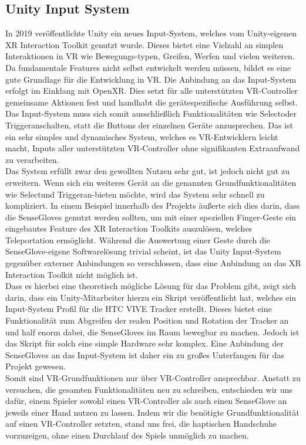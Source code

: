 \subsection{Unity Input System}
In 2019 veröffentlichte Unity ein neues Input-System, welches vom Unity-eigenen XR Interaction Toolkit genutzt wurde. Dieses bietet eine Vielzahl an simplen Interaktionen in VR wie Bewegungs-typen, Greifen, Werfen und vielen weiteren. Da fundamentale Features nicht selbst entwickelt werden müssen, bildet es eine gute Grundlage für die Entwicklung in VR. Die Anbindung an das Input-System erfolgt im Einklang mit OpenXR. Dies setzt für alle unterstützten VR-Controller gemeinsame Aktionen fest und handhabt die gerätespezifische Ausführung selbst. Das Input-System muss sich somit ausschließlich Funktionalitäten wie \dq Select\dq oder \dq Trigger\dq anschalten, statt die Buttons der einzelnen Geräte anzusprechen. Das ist ein sehr simples und dynamisches System, welches es VR-Entwicklern leicht macht, Inputs aller unterstützten VR-Controller ohne signifikanten Extraaufwand zu verarbeiten.\\
\noindent Das System erfüllt zwar den gewollten Nutzen sehr gut, ist jedoch nicht gut zu erweitern. Wenn sich ein weiteres Gerät an die genannten Grundfunktionalitäten wie \dq Select\dq und \dq Trigger\dq an-bieten möchte, wird das System sehr schnell zu kompliziert. In einem Beispiel innerhalb des Projekts äußerte sich dies darin, dass die SenseGloves genutzt werden sollten, um mit einer speziellen Finger-Geste ein eingebautes Feature des XR Interaction Toolkits auszulösen, welches Teleportation ermöglicht. Während die Auswertung einer Geste durch die SenseGlove-eigene Softwarelösung trivial scheint, ist das Unity Input-System gegenüber externer Anbindungen so verschlossen, dass eine Anbindung an das XR Interaction Toolkit nicht möglich ist.\\
\noindent Dass es hierbei eine theoretisch mögliche Lösung für das Problem gibt, zeigt sich darin, dass ein Unity-Mitarbeiter hierzu ein Skript veröffentlicht hat, welches ein Input-System Profil für die HTC VIVE Tracker erstellt. Dieses bietet eine Funktionalität zum Abgreifen der realen Position und Rotation der Tracker an und half enorm dabei, die SenseGloves im Raum bewegbar zu machen. Jedoch ist das Skript für solch eine simple Hardware sehr komplex. Eine Anbindung der SenseGloves an das Input-System ist daher ein zu großes Unterfangen für das Projekt gewesen.\\
\noindent Somit sind VR-Grundfunktionen nur über VR-Controller ansprechbar. Anstatt zu versuchen, die gesamten Funktionalitäten neu zu schreiben, entschieden wir uns dafür, einem Spieler sowohl einen VR-Controller als auch einen SenseGlove an jeweils einer Hand nutzen zu lassen. Indem wir die benötigte Grundfunktionalität auf einen VR-Controller setzten, stand uns frei, die haptischen Handschuhe vorzuzeigen, ohne einen Durchlauf des Spiels unmöglich zu machen.

